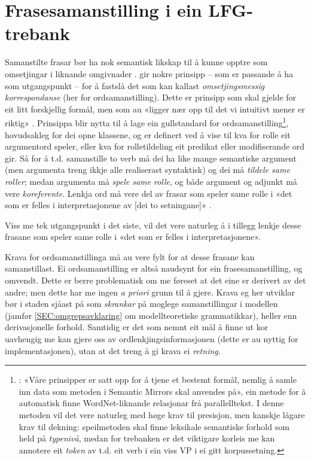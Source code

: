 \documentclass[11pt,a4paper,oneside,draft]{book}
\begin{document}
\section{Frasesamanstilling i ein LFG-trebank}
\label{sec-3.3}


Samanstilte frasar bør ha nok semantisk likskap til å kunne opptre som
omsetjingar i liknande omgivnader
\citep[s.~74]{dyvik2009lmp}. \citet{thunes2003eal} gir nokre prinsipp
-- som er passande å ha som utgangspunkt -- for å fastslå det som kan
kallast \emph{omsetjingsmessig korrespondanse} (her for
ordsamanstilling). Dette er prinsipp som skal gjelde for eit litt
forskjellig formål, men som au «ligger nær opp til det vi intuitivt
mener er riktig» \citep[s.~2]{thunes2003eal}. Prinsippa blir nytta til
å lage ein gullstandard for ordsamanstilling\footnote{\cite[s.~2]{thunes2003eal}: «Våre prinsipper er satt
opp for å tjene et bestemt formål, nemlig å samle inn data som metoden
i Semantic Mirrors skal anvendes på», ein metode for å automatisk
finne WordNet-liknande relasjonar frå parallelltekst. I denne metoden
vil det vere naturleg med høge krav til presisjon, men kanskje lågare
krav til dekning: speilmetoden skal finne leksikale semantiske forhold
som held på \emph{typenivå}, medan for trebanken er det viktigare korleis
me kan annotere eit \emph{token} av t.d. eit verb i ein viss VP i ei gitt
korpussetning. },
hovudsakleg for dei opne klassene, og er definert ved å vise til kva
for rolle eit argumentord speler, eller kva for rolletildeling eit
predikat eller modifiserande ord gir. Så for å t.d. samanstille to
verb må dei ha like mange semantiske argument (men argumenta treng
ikkje alle realiserast syntaktisk) og dei må \emph{tildele same roller};
medan argumenta må \emph{spele same rolle}, og både argument og adjunkt må
vere \emph{koreferente}. Lenkja ord må vere del av frasar som speler same
rolle i «det som er felles i interpretasjonene av [dei to setningane]»
\citep[s.~3]{thunes2003eal}.

Viss me tek utgangspunkt i det siste, vil det vere naturleg å i
tillegg lenkje desse frasane som speler same rolle i «det som er
felles i interpretasjonene».

Krava for ordsamanstillinga må au vere fylt for at desse frasane kan
samanstillast. Ei ordsamanstilling er altså naudsynt for ein
frasesamanstilling, og omvendt. Dette er berre problematisk om me
føreset at det eine er derivert av det andre; men dette har me ingen
\emph{a priori} grunn til å gjere. Krava eg her utviklar bør i staden
sjåast på som \emph{skrankar} på moglege samanstillingar i modellen (jamfør
\ref{SEC:omgrepsavklaring} om modellteoretiske grammatikkar), heller
enn derivasjonelle forhold. Samtidig er det som nemnt eit mål å finne
ut kor uavhengig me kan gjere oss av ordlenkjingsinformasjonen (dette
er au nyttig for implementasjonen), utan at det treng å gi krava ei
\emph{retning}.
\end{document}
